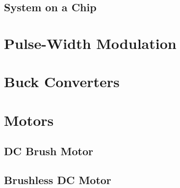\documentclass{article}
\begin{document}
\subsection{System on a Chip}

\section{Pulse-Width Modulation}

\section{Buck Converters}

\section{Motors}

\subsection{DC Brush Motor}

\subsection{Brushless DC Motor}
\end{document}
